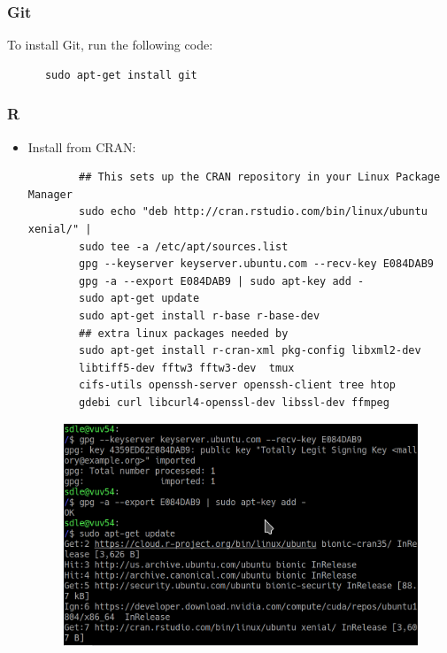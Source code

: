 \documentclass[10pt]{article} %
\begin{document}
      \subsubsection{Git}
      To install Git, run the following code:
      \begin{lstlisting}
      sudo apt-get install git
      \end{lstlisting}

    \subsubsection{R}

      \begin{itemize}

        \item Install from CRAN:

        \begin{lstlisting}
        ## This sets up the CRAN repository in your Linux Package Manager
        sudo echo "deb http://cran.rstudio.com/bin/linux/ubuntu xenial/" |
        sudo tee -a /etc/apt/sources.list
        gpg --keyserver keyserver.ubuntu.com --recv-key E084DAB9
        gpg -a --export E084DAB9 | sudo apt-key add -
        sudo apt-get update
        sudo apt-get install r-base r-base-dev
        ## extra linux packages needed by
        sudo apt-get install r-cran-xml pkg-config libxml2-dev
        libtiff5-dev fftw3 fftw3-dev  tmux
        cifs-utils openssh-server openssh-client tree htop
        gdebi curl libcurl4-openssl-dev libssl-dev ffmpeg

        \end{lstlisting}

    	\pagebreak

    	\begin{figure}[h!]
    		\centering
    		\includegraphics[width=0.7\linewidth]{figs/linux_r_install_gpgkeyserver}
    		\caption{}
    		\label{fig:linux_install_gdgpackages}
    	\end{figure}


\end{itemize}
\end{document}
